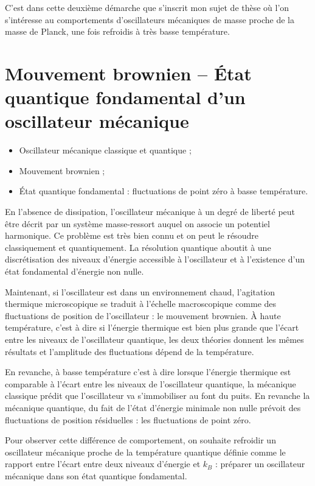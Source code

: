 \documentclass[12pt,a4paper]{article}
\newenvironment{transition}
{%
	\addcontentsline{ldf}{figure}{0}%
	\begin{transition2_env}}
	{\end{transition2_env}}
\newenvironment{slide}
	{%
		\addcontentsline{ldf}{figure}{0}%
		\begin{slide_env}}
		{\end{slide_env}
	}
\begin{document}
\begin{transition}
C'est dans cette deuxième démarche que s'inscrit mon sujet de thèse où l'on s'intéresse au comportements d'oscillateurs mécaniques de masse proche de la masse de Planck, une fois refroidis à très basse température. 
\end{transition}

\section{Mouvement brownien -- État quantique fondamental d'un oscillateur mécanique}

\begin{slide}
\begin{itemize}
\item Oscillateur mécanique classique et quantique ;
\item Mouvement brownien ;
\item État quantique fondamental : fluctuations de point zéro à basse température.
\end{itemize}
\end{slide}

En l'absence de dissipation, l'oscillateur mécanique à un degré de liberté peut être décrit par un système masse-ressort auquel on associe un potentiel harmonique.
Ce problème est très bien connu et on peut le résoudre classiquement et quantiquement.
La résolution quantique aboutit à une discrétisation des niveaux d'énergie accessible à l'oscillateur et à l'existence d'un état fondamental d'énergie non nulle.

Maintenant, si l'oscillateur est dans un environnement chaud, l'agitation thermique microscopique se traduit à l'échelle macroscopique comme des fluctuations de position de l'oscillateur : le mouvement brownien.
À haute température, c'est à dire si l'énergie thermique est bien plus grande que l'écart entre les niveaux de l'oscillateur quantique, les deux théories donnent les mêmes résultats et l'amplitude des fluctuations dépend de la température.

En revanche, à basse température c'est à dire lorsque l'énergie thermique est comparable à l'écart entre les niveaux de l'oscillateur quantique, la mécanique classique prédit que l'oscillateur va s'immobiliser au font du puits.
En revanche la mécanique quantique, du fait de l'état d'énergie minimale non nulle prévoit des fluctuations de position résiduelles : les fluctuations de point zéro.

Pour observer cette différence de comportement, on souhaite refroidir un oscillateur mécanique proche de la température quantique définie comme le rapport entre l'écart entre deux niveaux d'énergie et $k_B$ : préparer un oscillateur mécanique dans son état quantique fondamental.
\end{document}
